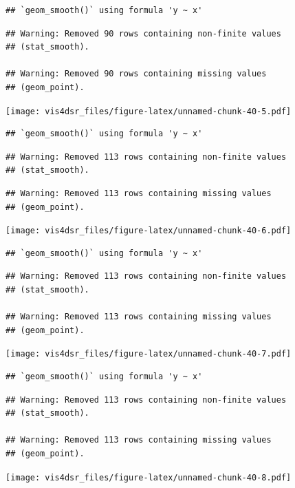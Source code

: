 \documentclass[
]{krantz}
\begin{document}
\begin{verbatim}
## `geom_smooth()` using formula 'y ~ x'
\end{verbatim}

\begin{verbatim}
## Warning: Removed 90 rows containing non-finite values
## (stat_smooth).

## Warning: Removed 90 rows containing missing values
## (geom_point).
\end{verbatim}

\texttt{[image: vis4dsr\_files/figure-latex/unnamed-chunk-40-5.pdf]}

\begin{verbatim}
## `geom_smooth()` using formula 'y ~ x'
\end{verbatim}

\begin{verbatim}
## Warning: Removed 113 rows containing non-finite values
## (stat_smooth).
\end{verbatim}

\begin{verbatim}
## Warning: Removed 113 rows containing missing values
## (geom_point).
\end{verbatim}

\texttt{[image: vis4dsr\_files/figure-latex/unnamed-chunk-40-6.pdf]}

\begin{verbatim}
## `geom_smooth()` using formula 'y ~ x'
\end{verbatim}

\begin{verbatim}
## Warning: Removed 113 rows containing non-finite values
## (stat_smooth).

## Warning: Removed 113 rows containing missing values
## (geom_point).
\end{verbatim}

\texttt{[image: vis4dsr\_files/figure-latex/unnamed-chunk-40-7.pdf]}

\begin{verbatim}
## `geom_smooth()` using formula 'y ~ x'
\end{verbatim}

\begin{verbatim}
## Warning: Removed 113 rows containing non-finite values
## (stat_smooth).

## Warning: Removed 113 rows containing missing values
## (geom_point).
\end{verbatim}

\texttt{[image: vis4dsr\_files/figure-latex/unnamed-chunk-40-8.pdf]}
\end{document}
